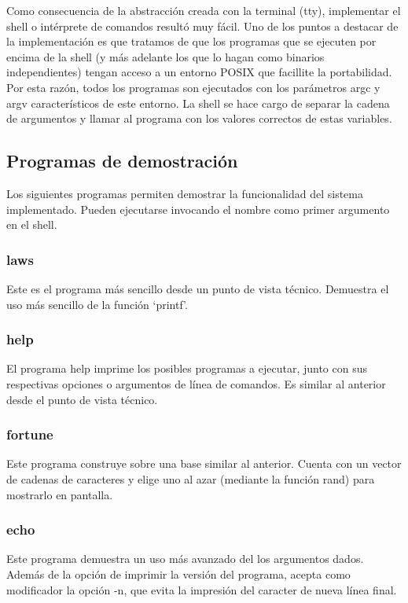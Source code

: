 \documentclass[11pt]{article}
\begin{document}
Como consecuencia de la abstracción creada con la terminal (tty), implementar el shell o intérprete de comandos resultó muy fácil. Uno de los puntos a destacar de la implementación es que tratamos de que los programas que se ejecuten por encima de la shell (y más adelante los que lo hagan como binarios independientes) tengan acceso a un entorno POSIX que facillite la portabilidad. Por esta razón, todos los programas son ejecutados con los parámetros argc y argv característicos de este entorno. La shell se hace cargo de separar la cadena de argumentos y llamar al programa con los valores correctos de estas variables.

\subsection{Programas de demostración}

Los siguientes programas permiten demostrar la funcionalidad del sistema implementado. Pueden ejecutarse invocando el nombre como primer argumento en el shell.

\subsubsection{laws}
Este es el programa más sencillo desde un punto de vista técnico. Demuestra el uso más sencillo de la función ‘printf’.

\subsubsection{help}
El programa help imprime los posibles programas a ejecutar, junto con sus respectivas opciones o argumentos de línea de comandos. Es similar al anterior desde el punto de vista técnico.

\subsubsection{fortune}
Este programa construye sobre una base similar al anterior. Cuenta con un vector de cadenas de caracteres y elige uno al azar (mediante la función rand) para mostrarlo en pantalla.

\subsubsection{echo}
Este programa demuestra un uso más avanzado del los argumentos dados. Además de la opción de imprimir la versión del programa, acepta como modificador la opción -n, que evita la impresión del caracter de nueva línea final.
\end{document}
